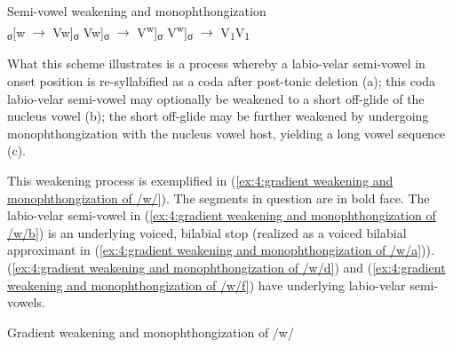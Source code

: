 \newpage
\ea\label{exfig: semi-vowel weakening and monophthongization}
Semi-vowel weakening and monophthongization\\
    \ea \textsubscript{σ}[w  $\to$ Vw]\textsubscript{σ}
    \ex Vw]\textsubscript{σ} $\to$ V\textsuperscript{w}]\textsubscript{σ}
    \ex V\textsuperscript{w}]\textsubscript{σ} $\to$ V\textsubscript{1}V\textsubscript{1}
    \z
\z

%

What this scheme illustrates is a process whereby a labio-velar semi-vowel in onset position is re-syllabified as a coda after post-tonic deletion (a); this coda labio-velar semi-vowel may optionally be weakened to a short off-glide of the nucleus vowel (b); the short off-glide may be further weakened by undergoing monophthongization with the nucleus vowel host, yielding a long vowel sequence (c).

This weakening process is exemplified in (\ref{ex:4:gradient weakening and monophthongization of /w/}). The segments in question are in bold face. The labio-velar semi-vowel in (\ref{ex:4:gradient weakening and monophthongization of /w/b}) is an underlying voiced, bilabial stop (realized as a voiced bilabial approximant in (\ref{ex:4:gradient weakening and monophthongization of /w/a})). (\ref{ex:4:gradient weakening and monophthongization of /w/d}) and (\ref{ex:4:gradient weakening and monophthongization of /w/f}) have underlying labio-velar semi-vowels.

\ea\label{ex:4:gradient weakening and monophthongization of /w/}
{Gradient weakening and monophthongization of /w/}

